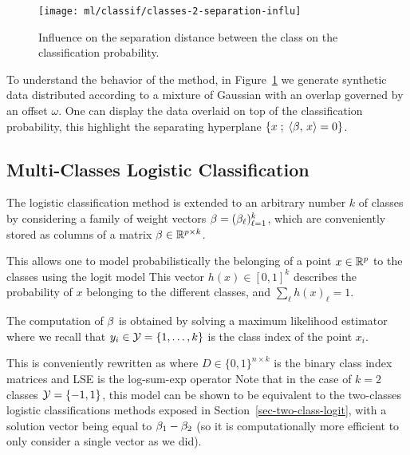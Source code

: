 \begin{figure}
\centering
\texttt{[image: ml/classif/classes-2-separation-influ]}
\caption{\label{fig-separation-influ}
Influence on the separation distance between the class on the classification probability. 
}
\end{figure}

To understand the behavior of the method, in Figure~\ref{fig-separation-influ} we generate synthetic data distributed according to a mixture of Gaussian with an overlap governed by an offset $\omega$. 
%
One can display the data overlaid on top of the classification probability, this highlight the separating hyperplane $\left\{ x \;;\; \langle \beta,\,x\rangle=0 \right\}$.




\subsection{Multi-Classes Logistic Classification}
\label{sec-multiclass-logit}

The logistic classification method is extended to an arbitrary number
$k$ of classes by considering a family of weight vectors $\beta = ( \beta_\ell )_{\ell=1}^k$, which are conveniently stored as columns of a matrix $\beta \in \mathbb{R}^{p \times k}$.

This allows one to model probabilistically the belonging of a point $x \in \mathbb{R}^p$ to 
the classes using the logit model
This vector $h(x) \in [0,1]^k$ describes the probability of $x$
belonging to the different classes, and $\sum_\ell h(x)_\ell = 1$.

The computation of $\beta$ is obtained by solving a maximum likelihood
estimator
where we recall that $y_i \in \mathcal{Y} = \{1,\ldots,k\}$ is the class index of
the point $x_i$.

This is conveniently rewritten as
where $D \in \{0,1\}^{n \times k}$ is the binary class index matrices
and LSE is the log-sum-exp operator
Note that in the case of $k=2$ classes $\mathcal{Y}=\{-1,1\}$, this model can be shown to be equivalent to the two-classes logistic classifications methods exposed in Section~\eqref{sec-two-class-logit}, with a solution vector being equal to $\beta_1-\beta_2$ (so it is computationally more efficient to only consider a single vector as we did).

